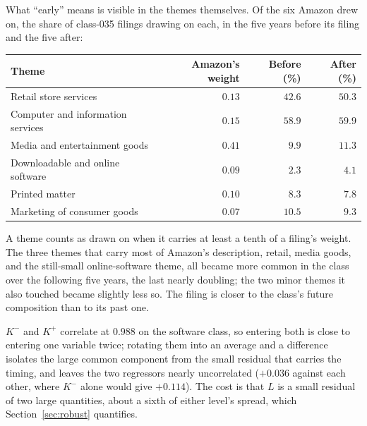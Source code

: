 What ``early'' means is visible in the themes themselves. Of the six Amazon
drew on, the share of class-035 filings drawing on each, in the five years
before its filing and the five after:

\begin{center}\small
\begin{tabular}{lrrr}
\toprule
Theme & Amazon's weight & Before (\%) & After (\%) \\
\midrule
Retail store services              & $0.13$ & $42.6$ & $50.3$ \\
Computer and information services  & $0.15$ & $58.9$ & $59.9$ \\
Media and entertainment goods      & $0.41$ & $9.9$  & $11.3$ \\
Downloadable and online software   & $0.09$ & $2.3$  & $4.1$  \\
Printed matter                     & $0.10$ & $8.3$  & $7.8$  \\
Marketing of consumer goods        & $0.07$ & $10.5$ & $9.3$  \\
\bottomrule
\end{tabular}
\end{center}

\noindent A theme counts as drawn on when it carries at least a tenth of a
filing's weight. The three themes that carry most of Amazon's description,
retail, media goods, and the still-small online-software theme, all became
more common in the class over the following five years, the last nearly
doubling; the two minor themes it also touched became slightly less so. The
filing is closer to the class's future composition than to its past one.

$K^{-}$ and $K^{+}$
correlate at $0.988$ on the software class, so entering both is close to
entering one variable twice; rotating them into an average and a difference
isolates the large common component from the small residual that carries the
timing, and leaves the two regressors nearly uncorrelated ($+0.036$ against
each other, where $K^{-}$ alone would give $+0.114$). The cost is that $L$ is
a small residual of two large quantities, about a sixth of either level's
spread, which Section~\ref{sec:robust} quantifies.

